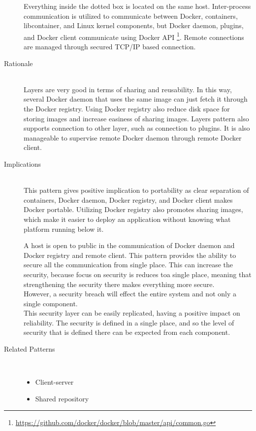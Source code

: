 \begin{description}
Everything inside the dotted box is located on the same host. Inter-process communication is utilized to communicate between Docker, containers, libcontainer, and Linux kernel components, but Docker daemon, plugins, and Docker client communicate using Docker API
\footnote{\url{https://github.com/docker/docker/blob/master/api/common.go}}. Remote connections are managed through secured TCP/IP based connection.

\item [Rationale] ~\\
Layers are very good in terms of sharing and reusability. In this way, several
Docker daemon that uses the same image can just fetch it through the Docker
registry. Using Docker registry also reduce disk space for storing images and
increase easiness of sharing images. Layers pattern also supports connection to
other layer, such as connection to plugins. It is also manageable to supervise
remote Docker daemon through remote Docker client.

\item [Implications]~\\
This pattern gives positive implication to portability as clear separation of
containers, Docker daemon, Docker registry, and Docker client makes Docker
portable. Utilizing Docker registry also promotes sharing images, which make it
easier to deploy an application without knowing what platform running below it.

A host is open to public in the communication of Docker
daemon and Docker registry and remote client. This pattern provides the ability to secure all the communication from single place. This can increase the security, because focus on security is reduces toa single place, meaning that strengthening the security there makes everything more secure. \\
However, a security breach will effect the entire system and not only a single component. \\
This security layer can be easily replicated, having a positive impact on reliability. The security is defined in a single place, and so the level of security that is defined there can be expected from each component.

\item [Related Patterns]~
\begin{itemize}
	\item Client-server
	\item Shared repository
\end{itemize}
\end{description}

